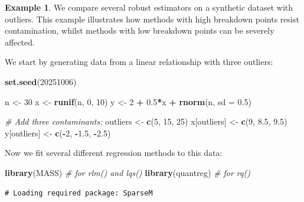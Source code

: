 \documentclass[
  a4paper,
]{article}
\newenvironment{Shaded}{\begin{snugshade}}{\end{snugshade}}
\newcommand{\AttributeTok}[1]{\textcolor[rgb]{0.13,0.29,0.53}{#1}}
\newcommand{\CommentTok}[1]{\textcolor[rgb]{0.56,0.35,0.01}{\textit{#1}}}
\newcommand{\DecValTok}[1]{\textcolor[rgb]{0.00,0.00,0.81}{#1}}
\newcommand{\FloatTok}[1]{\textcolor[rgb]{0.00,0.00,0.81}{#1}}
\newcommand{\FunctionTok}[1]{\textcolor[rgb]{0.13,0.29,0.53}{\textbf{#1}}}
\newcommand{\NormalTok}[1]{#1}
\newcommand{\OtherTok}[1]{\textcolor[rgb]{0.56,0.35,0.01}{#1}}
\newcommand{\SpecialCharTok}[1]{\textcolor[rgb]{0.81,0.36,0.00}{\textbf{#1}}}
\theoremstyle{definition}
\theoremstyle{definition}
\newtheorem{example}{Example}[section]
\theoremstyle{definition}
\theoremstyle{definition}
\theoremstyle{remark}
\begin{document}
\begin{example}
We compare several robust estimators on a synthetic dataset with outliers.
This example illustrates how methods with high breakdown points resist
contamination, whilst methods with low breakdown points can be severely
affected.

We start by generating data from a linear relationship with three
outliers:

\begin{Shaded}
\begin{Highlighting}[]
\FunctionTok{set.seed}\NormalTok{(}\DecValTok{20251006}\NormalTok{)}

\NormalTok{n }\OtherTok{\textless{}{-}} \DecValTok{30}
\NormalTok{x }\OtherTok{\textless{}{-}} \FunctionTok{runif}\NormalTok{(n, }\DecValTok{0}\NormalTok{, }\DecValTok{10}\NormalTok{)}
\NormalTok{y }\OtherTok{\textless{}{-}} \DecValTok{2} \SpecialCharTok{+} \FloatTok{0.5}\SpecialCharTok{*}\NormalTok{x }\SpecialCharTok{+} \FunctionTok{rnorm}\NormalTok{(n, }\AttributeTok{sd =} \FloatTok{0.5}\NormalTok{)}

\CommentTok{\# Add three contaminants:}
\NormalTok{outliers }\OtherTok{\textless{}{-}} \FunctionTok{c}\NormalTok{(}\DecValTok{5}\NormalTok{, }\DecValTok{15}\NormalTok{, }\DecValTok{25}\NormalTok{)}
\NormalTok{x[outliers] }\OtherTok{\textless{}{-}} \FunctionTok{c}\NormalTok{(}\DecValTok{9}\NormalTok{, }\FloatTok{8.5}\NormalTok{, }\FloatTok{9.5}\NormalTok{)}
\NormalTok{y[outliers] }\OtherTok{\textless{}{-}} \FunctionTok{c}\NormalTok{(}\SpecialCharTok{{-}}\DecValTok{2}\NormalTok{, }\SpecialCharTok{{-}}\FloatTok{1.5}\NormalTok{, }\SpecialCharTok{{-}}\FloatTok{2.5}\NormalTok{)}
\end{Highlighting}
\end{Shaded}

Now we fit several different regression methods to this data:

\begin{Shaded}
\begin{Highlighting}[]
\FunctionTok{library}\NormalTok{(MASS)     }\CommentTok{\# for rlm() and lqs()}
\FunctionTok{library}\NormalTok{(quantreg) }\CommentTok{\# for rq()}
\end{Highlighting}
\end{Shaded}

\begin{verbatim}
# Loading required package: SparseM
\end{verbatim}


\end{example}
\end{document}
